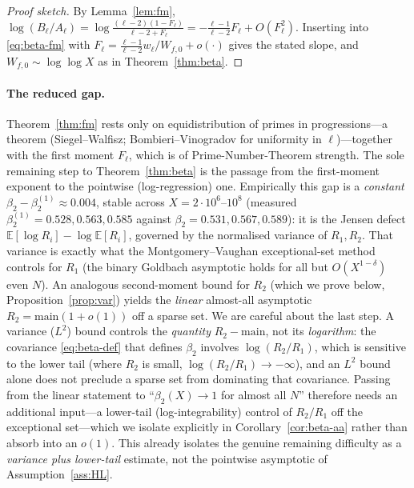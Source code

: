 \documentclass[]{interact}%
\begin{document}
\begin{proof}[Proof sketch]
By Lemma~\ref{lem:fm}, $\log(B_\ell/A_\ell)=\log\frac{(\ell-2)(1-F_\ell)}{\ell-2+F_\ell}
=-\frac{\ell-1}{\ell-2}F_\ell+O(F_\ell^2)$. Inserting into \eqref{eq:beta-fm} with
$F_\ell=\frac{\ell-1}{\ell-2}w_\ell/W_{f,0}+o(\cdot)$ gives the stated slope,
and $W_{f,0}\sim\log\log X$ as in Theorem~\ref{thm:beta}.
\end{proof}

\paragraph{The reduced gap.}
Theorem~\ref{thm:fm} rests only on equidistribution of primes in progressions---a
theorem (Siegel--Walfisz; Bombieri--Vinogradov for uniformity in $\ell$)---together
with the first moment $F_\ell$, which is of Prime-Number-Theorem strength. The sole
remaining step to Theorem~\ref{thm:beta} is the passage from the first-moment exponent
to the pointwise (log-regression) one. Empirically this gap is a \emph{constant}
$\beta_2-\beta_2^{(1)}\approx0.004$, stable across $X=2\cdot10^{6}$--$10^{8}$
(measured $\beta_2^{(1)}=0.528,0.563,0.585$ against $\beta_2=0.531,0.567,0.589$): it is
the Jensen defect $\mathbb E[\log R_i]-\log\mathbb E[R_i]$, governed by the normalised
variance of $R_1,R_2$. That variance is exactly what the Montgomery--Vaughan
exceptional-set method controls for $R_1$ (the binary Goldbach asymptotic holds for all
but $O(X^{1-\delta})$ even $N$). An analogous second-moment bound for $R_2$ (which we
prove below, Proposition~\ref{prop:var}) yields the \emph{linear} almost-all asymptotic
$R_2=\mathrm{main}(1+o(1))$ off a sparse set. We are careful about the last step. A
variance ($L^2$) bound controls the \emph{quantity} $R_2-\mathrm{main}$, not its
\emph{logarithm}: the covariance \eqref{eq:beta-def} that defines $\beta_2$ involves
$\log(R_2/R_1)$, which is sensitive to the lower tail (where $R_2$ is small,
$\log(R_2/R_1)\to-\infty$), and an $L^2$ bound alone does not preclude a sparse set from
dominating that covariance. Passing from the linear statement to
``$\beta_2(X)\to1$ for almost all $N$'' therefore needs an additional input---a
lower-tail (log-integrability) control of $R_2/R_1$ off the exceptional set---which we
isolate explicitly in Corollary~\ref{cor:beta-aa} rather than absorb into an $o(1)$.
This already isolates the genuine remaining difficulty as a \emph{variance plus
lower-tail} estimate, not the pointwise asymptotic of Assumption~\ref{ass:HL}.
\end{document}
